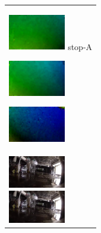 \begin{figure}[htbp]
\begin{tabular}{l}
\begin{minipage}{0.165\hsize}
\begin{center}
          \includegraphics[clip, width=2.5cm]{./Figures/optic_stop1-3.eps}
          \hspace{2.0cm} {stop-A}
        \end{center}
      \end{minipage}
      \begin{minipage}{0.165\hsize}
        \begin{center}
          \includegraphics[clip, width=2.5cm]{./Figures/optic_stop1-4.eps}
          \hspace{0.1cm} { }
        \end{center}
      \end{minipage}
      \begin{minipage}{0.165\hsize}
        \begin{center}
          \includegraphics[clip, width=2.5cm]{./Figures/optic_stop1-5.eps}
          \hspace{2.2cm} { }
        \end{center}
      \end{minipage}
\\ %
      \begin{minipage}{0.165\hsize}
        \begin{center}
          \includegraphics[clip, width=2.5cm]{./Figures/still_stop2-1.eps}
        \end{center}
      \end{minipage}
      \begin{minipage}{0.165\hsize}
        \begin{center}
          \includegraphics[clip, width=2.5cm]{./Figures/still_stop2-2.eps}

\end{center}
\end{minipage}
\end{tabular}
\end{figure}
